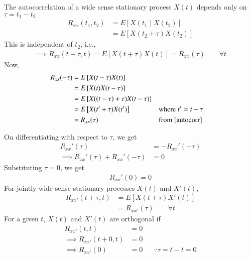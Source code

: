 \documentclass{beamer}
\providecommand{\mean}[1]{E\left[ #1 \right]}
\begin{document}
	\begin{frame}
	The autocorrelation of a wide sense stationary process $X(t)$ depends only on $\tau = t_1 - t_2$
	\begin{align}
		R_{xx}(t_1, t_2) &= \mean{X(t_1) X(t_2)} \\
		&= \mean{X(t_2+\tau) X(t_2)}
	\end{align}
	This is independent of $t_2$, i.e.,
	\begin{align}
		\implies R_{xx}(t+\tau,t) = \mean{X(t+\tau) X(t)} = R_{xx}(\tau) \qquad \forall t \label{autocorr}
	\end{align}	
	Now, 
	\begin{align}
		R_{xx}(-\tau) &= \mean{X(t-\tau) X(t)} \\
		&= \mean{X(t) X(t-\tau)} \\
		&= \mean{X((t-\tau)+\tau) X(t-\tau)} \\
		&= \mean{X(t'+\tau) X(t')} && \text{where } t' = t - \tau \\
		&= R_{xx}(\tau) && \text{from } \ref{autocorr}
	\end{align}
	\end{frame}
	
	\begin{frame}
	On differentiating with respect to $\tau$, we get
	\begin{align}
		R_{xx}'(\tau) &= -R_{xx}'(-\tau) \\
		\implies R_{xx}'(\tau) + R_{xx}'(-\tau) &= 0
	\end{align}
	Substituting $\tau = 0$, we get
	\begin{align}
		R_{xx}'(0) = 0
	\end{align}
	For jointly wide sense stationary processes $X(t)$ and $X'(t)$, 
	\begin{align}
		R_{xx'}(t+\tau,t) &= \mean{X(t+\tau)X'(t)} \\
		&= R_{xx'}(\tau) \qquad \forall t
	\end{align}
	For a given $t$, $X(t)$ and $X'(t)$ are orthogonal if 
	\begin{align}
		R_{xx'}(t,t) &= 0 \\
		\implies R_{xx'}(t+0,t) &= 0 \\
		\implies R_{xx'}(0) &= 0 && \because \tau = t - t = 0 
	\end{align}
	\end{frame}
	
\end{document}
